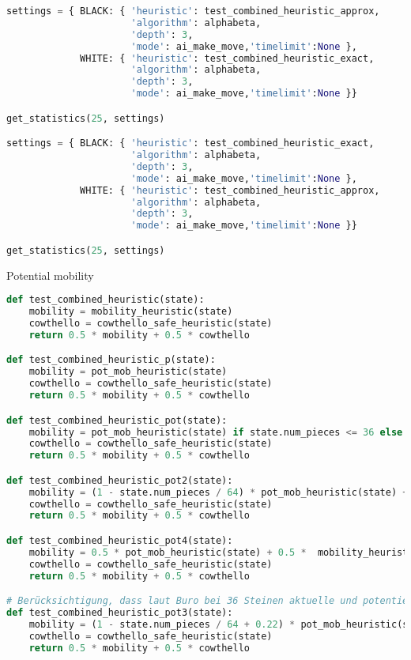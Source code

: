 \begin{lstlisting}[language=Python]
settings = { BLACK: { 'heuristic': test_combined_heuristic_approx,
                      'algorithm': alphabeta,
                      'depth': 3,
                      'mode': ai_make_move,'timelimit':None },
             WHITE: { 'heuristic': test_combined_heuristic_exact,
                      'algorithm': alphabeta,
                      'depth': 3,
                      'mode': ai_make_move,'timelimit':None }}

get_statistics(25, settings)

settings = { BLACK: { 'heuristic': test_combined_heuristic_exact,
                      'algorithm': alphabeta,
                      'depth': 3,
                      'mode': ai_make_move,'timelimit':None },
             WHITE: { 'heuristic': test_combined_heuristic_approx,
                      'algorithm': alphabeta,
                      'depth': 3,
                      'mode': ai_make_move,'timelimit':None }}

get_statistics(25, settings)
\end{lstlisting}

Potential mobility

\begin{lstlisting}[language=Python]
def test_combined_heuristic(state):
    mobility = mobility_heuristic(state)
    cowthello = cowthello_safe_heuristic(state)
    return 0.5 * mobility + 0.5 * cowthello

def test_combined_heuristic_p(state):
    mobility = pot_mob_heuristic(state)
    cowthello = cowthello_safe_heuristic(state)
    return 0.5 * mobility + 0.5 * cowthello

def test_combined_heuristic_pot(state):
    mobility = pot_mob_heuristic(state) if state.num_pieces <= 36 else mobility_heuristic(state)
    cowthello = cowthello_safe_heuristic(state)
    return 0.5 * mobility + 0.5 * cowthello

def test_combined_heuristic_pot2(state):
    mobility = (1 - state.num_pieces / 64) * pot_mob_heuristic(state) + (state.num_pieces / 64) *  mobility_heuristic(state)
    cowthello = cowthello_safe_heuristic(state)
    return 0.5 * mobility + 0.5 * cowthello

def test_combined_heuristic_pot4(state):
    mobility = 0.5 * pot_mob_heuristic(state) + 0.5 *  mobility_heuristic(state)
    cowthello = cowthello_safe_heuristic(state)
    return 0.5 * mobility + 0.5 * cowthello

# Berücksichtigung, dass laut Buro bei 36 Steinen aktuelle und potentielle Mobilität gleich gut sind, vorrausgesetzt die Mobilitäten haben die gleiche Größenordnung
def test_combined_heuristic_pot3(state):
    mobility = (1 - state.num_pieces / 64 + 0.22) * pot_mob_heuristic(state) + (state.num_pieces / 64 - 0.22) *  mobility_heuristic(state)
    cowthello = cowthello_safe_heuristic(state)
    return 0.5 * mobility + 0.5 * cowthello
\end{lstlisting}

